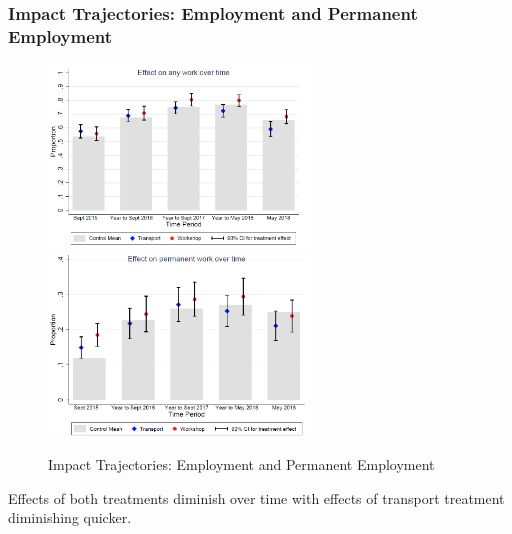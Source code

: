         \subsubsection{Impact Trajectories: Employment and Permanent Employment}
            \begin{figure}[H]
                \centering
                \includegraphics[width=2.75in]{images/ch6/Abebe result 2 emp.png}
                \includegraphics[width=2.75in]{images/ch6/Abebe result 2 perm emp.png}
                \caption{Impact Trajectories: Employment and Permanent Employment}
            \end{figure}
            Effects of both treatments diminish over time with effects of transport treatment diminishing quicker.
            
